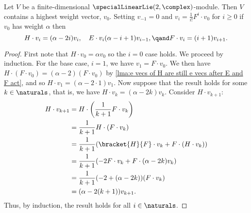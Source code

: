 \documentclass[fleqn]{NotesClass}
\begin{document}
    \begin{lma}{}{}
        Let \(V\) be a finite-dimensional \(\specialLinearLie(2, \complex)\)-module.
        Then \(V\) contains a highest weight vector, \(v_0\).
        Setting \(v_{-1} = 0\) and \(v_i = \frac{1}{i!} F^i \cdot v_0\) for \(i \ge 0\) if \(v_0\) has weight \(\alpha\) then
        \begin{equation}
            H \cdot v_i = (\alpha - 2i)v_i, \quad E \cdot v_i  (\alpha - i + 1) v_{i-1}, \qand F \cdot v_i = (i + 1) v_{i+1}.
        \end{equation}
        \begin{proof}
            First note that \(H \cdot v_0 = \alpha v_0\) so the \(i = 0\) case holds.
            We proceed by induction.
            For the base case, \(i = 1\), we have \(v_1 = F \cdot v_0\).
            We then have \(H \cdot (F \cdot v_0) = (\alpha - 2)(F \cdot v_0)\) by \cref{lma:e vecs of H are still e vecs after E and F act}, and so \(H \cdot v_1 = (\alpha - 2 \cdot 1)v_1\).
            Now suppose that the result holds for some \(k \in \naturals\), that is, we have \(H \cdot v_k = (\alpha - 2k) v_k\).
            Consider \(H \cdot v_{k+1}\):
            \begin{align}
                H \cdot v_{k+1} &= H \cdot \left( \frac{1}{k + 1}F \cdot v_k \right)\\
                &= \frac{1}{k + 1}H \cdot (F \cdot v_k)\\
                &= \frac{1}{k + 1} (\bracket{H}{F} \cdot v_k + F \cdot (H \cdot v_k))\\
                &= \frac{1}{k + 1} (-2F \cdot v_k + F \cdot (\alpha - 2k)v_k)\\
                &= \frac{1}{k + 1} (-2 + (\alpha - 2k))(F \cdot v_k)\\
                &= (\alpha - 2(k + 1)) v_{k + 1}.
            \end{align}
            Thus, by induction, the result holds for all \(i \in \naturals\).
            

\end{proof}
\end{lma}
\end{document}
